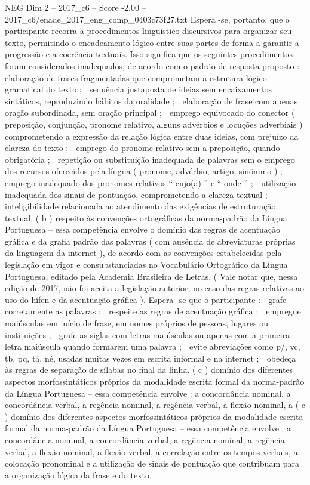 \begin{textsample}{NEG Dim 2 – 2017\_c6 – Score -2.00 – 2017\_c6/enade\_2017\_eng\_comp\_0403c73f27.txt}
Espera -se, portanto, que o participante recorra a procedimentos linguístico-discursivos para organizar seu texto, permitindo o encadeamento lógico entre suas partes de forma a garantir a progressão e a coerência textuais.
Isso significa que os seguintes procedimentos foram considerados inadequados, de acordo com o padrão de resposta proposto :  elaboração de frases fragmentadas que comprometam a estrutura lógico-gramatical do texto ;  sequência justaposta de ideias sem encaixamentos sintáticos, reproduzindo hábitos da oralidade ;  elaboração de frase com apenas oração subordinada, sem oração principal ;  emprego equivocado do conector ( preposição, conjunção, pronome relativo, alguns advérbios e locuções adverbiais ) comprometendo a expressão da relação lógica entre duas ideias, com prejuízo da clareza do texto ;  emprego do pronome relativo sem a preposição, quando obrigatória ;  repetição ou substituição inadequada de palavras sem o emprego dos recursos oferecidos pela língua ( pronome, advérbio, artigo, sinônimo ) ;  emprego inadequado dos pronomes relativos “ cujo(a) ” e “ onde ” ;  utilização inadequada dos sinais de pontuação, comprometendo a clareza textual ;  inteligibilidade relacionada ao atendimento das exigências de estruturação textual. ( b ) respeito às convenções ortográficas da norma-padrão da Língua Portuguesa – essa competência envolve o domínio das regras de acentuação gráfica e da grafia padrão das palavras ( com ausência de abreviaturas próprias da linguagem da internet ), de acordo com as convenções estabelecidas pela legislação em vigor e consubstanciadas no Vocabulário Ortográfico da Língua Portuguesa, editado pela Academia Brasileira de Letras. ( Vale notar que, nessa edição de 2017, não foi aceita a legislação anterior, no caso das regras relativas ao uso do hífen e da acentuação gráfica ).
Espera -se que o participante :  grafe corretamente as palavras ;  respeite as regras de acentuação gráfica ;  empregue maiúsculas em início de frase, em nomes próprios de pessoas, lugares ou instituições ;  grafe as siglas com letras maiúsculas ou apenas com a primeira letra maiúscula quando formarem uma palavra ;  evite abreviações como p/, vc, tb, pq, tá, né, usadas muitas vezes em escrita informal e na internet ;  obedeça às regras de separação de sílabas no final da linha. ( c ) domínio dos diferentes aspectos morfossintáticos próprios da modalidade escrita formal da norma-padrão da Língua Portuguesa – essa competência envolve : a concordância nominal, a concordância verbal, a regência nominal, a regência verbal, a flexão nominal, a ( c ) domínio dos diferentes aspectos morfossintáticos próprios da modalidade escrita formal da norma-padrão da Língua Portuguesa – essa competência envolve : a concordância nominal, a concordância verbal, a regência nominal, a regência verbal, a flexão nominal, a flexão verbal, a correlação entre os tempos verbais, a colocação pronominal e a utilização de sinais de pontuação que contribuam para a organização lógica da frase e do texto.

\end{textsample}

